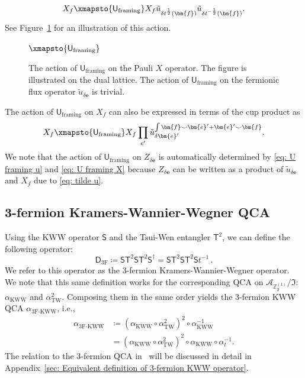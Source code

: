 \documentclass[aps,twocolumn,prx,floatfix,preprintnumbers, nofootinbib,10pt]{revtex4-2}
\numberwithin{equation}{section}
\theoremstyle{definition}
\theoremstyle{remark}
\theoremstyle{claim}
\newcommand{\aKWW}{\alpha_\text{KWW}}
\newcommand{\aTW}{\alpha_\text{TW}}
\newcommand{\athreeF}{\alpha_\text{3F-KWW}}
\newcommand{\Z}{{\mathbb Z}}
\newcommand{\mc}[1]{\mathcal{#1}}
\renewcommand{\sf}[1]{\mathsf{#1}}
\begin{document}
\begin{equation}
X_f \xmapsto{\sf{U}_{\text{framing}}} X_f \tilde{u}_{\delta t^{\frac{1}{2}}(\bm{f})} \tilde{u}_{\delta t^{-\frac{1}{2}}(\bm{f})}.
\label{eq: U framing X}
\end{equation}
See Figure~\ref{fig: U framing} for an illustration of this action.
\begin{figure}[t]
\centering
{}
$\xmapsto{\sf{U}_{\text{framing}}}$
\caption{The action of $\sf{U}_{\text{framing}}$ on the Pauli $X$ operator. The figure is illustrated on the dual lattice. The action of $\sf{U}_{\text{framing}}$ on the fermionic flux operator $\tilde{u}_{\delta \bm{e}}$ is trivial.}
\label{fig: U framing}
\end{figure}
The action of $\sf{U}_{\text{framing}}$ on $X_f$ can also be expressed in terms of the cup product as
\begin{equation}
X_f \xmapsto{\sf{U}_{\text{framing}}} X_f \prod_{e^{\prime}} \tilde{u}_{\delta \bm{e}^{\prime}}^{\int \bm{f} \smile \bm{e}^{\prime} + \bm{e}^{\prime} \smile \bm{f}}.
\label{eq: U framing X cup}
\end{equation}
We note that the action of $\sf{U}_{\text{framing}}$ on $Z_{\delta \bm{e}}$ is automatically determined by \eqref{eq: U framing u} and \eqref{eq: U framing X} because $Z_{\delta \bm{e}}$ can be written as a product of $\tilde{u}_{\delta \bm{e}}$ and $X_f$ due to \eqref{eq: tilde u}.


\subsection{3-fermion Kramers-Wannier-Wegner QCA}
\label{sec: 3-fermion KWW}
Using the KWW operator $\mathsf{S}$ and the Tsui-Wen entangler $\sf{T}^2$, we can define the following operator:
\begin{equation}
\mathsf{D}_\text{3F} \coloneq \mathsf{S} \sf{T}^2 \mathsf{S} \sf{T}^2 \sf{S}^{\dagger}
= \mathsf{S} \sf{T}^2 \mathsf{S} \sf{T}^2 \sf{S} t^{-1} \,.
\end{equation}
We refer to this operator as the 3-fermion Kramers-Wannier-Wegner operator. We note that this same definition works for the corresponding QCA on $\mc{A}_{\Z_2^{(1)}} / \mathfrak{I}$: $\aKWW$ and $\aTW^2$. Composing them in the same order yields the 3-fermion KWW QCA $\athreeF$, i.e.,
\begin{equation}
\begin{aligned}
\athreeF
&\coloneq (\aKWW \circ \aTW^2)^2 \circ \aKWW^{-1} \\
&= (\aKWW \circ \aTW^2)^2 \circ \aKWW \circ \alpha_t^{-1}.
\end{aligned}
\end{equation}
The relation to the 3-fermion QCA in~\cite[Appendix E]{Shirley_2022} will be discussed in detail in Appendix~\ref{sec: Equivalent definition of 3-fermion KWW operator}.
\end{document}
